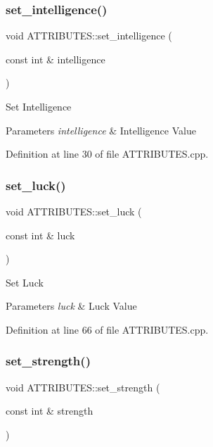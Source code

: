 \subsubsection{\texorpdfstring{set\_intelligence()}{set\_intelligence()}}
{\footnotesize\ttfamily void A\+T\+T\+R\+I\+B\+U\+T\+E\+S\+::set\+\_\+intelligence (\begin{DoxyParamCaption}\item[{const int \&}]{intelligence }\end{DoxyParamCaption})}



Set Intelligence 


\begin{DoxyParams}{Parameters}
{\em intelligence} & Intelligence Value\\
\hline
\end{DoxyParams}


Definition at line 30 of file A\+T\+T\+R\+I\+B\+U\+T\+E\+S.\+cpp.

\mbox{\label{class_a_t_t_r_i_b_u_t_e_s_aaccae64810ea2e0516cb1250da213641}} 
\subsubsection{\texorpdfstring{set\_luck()}{set\_luck()}}
{\footnotesize\ttfamily void A\+T\+T\+R\+I\+B\+U\+T\+E\+S\+::set\+\_\+luck (\begin{DoxyParamCaption}\item[{const int \&}]{luck }\end{DoxyParamCaption})}



Set Luck 


\begin{DoxyParams}{Parameters}
{\em luck} & Luck Value\\
\hline
\end{DoxyParams}


Definition at line 66 of file A\+T\+T\+R\+I\+B\+U\+T\+E\+S.\+cpp.

\mbox{\label{class_a_t_t_r_i_b_u_t_e_s_a53a4d269842f1989fda9865e3aa9c96f}} 
\subsubsection{\texorpdfstring{set\_strength()}{set\_strength()}}
{\footnotesize\ttfamily void A\+T\+T\+R\+I\+B\+U\+T\+E\+S\+::set\+\_\+strength (\begin{DoxyParamCaption}\item[{const int \&}]{strength }\end{DoxyParamCaption})}



